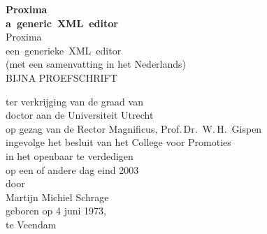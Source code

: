 \newcommand{\engtitle}{Proxima\\
a~generic~XML~editor}

\newcommand{\nltitle}{Proxima\\
een~generieke~XML~editor}

\thispagestyle{empty}

\parbox{141mm}{
\begin{center}
  {\sffamily\bfseries\Huge\engtitle\\}
  \vspace{1cm}
  {\sffamily\Large\nltitle\\}
  \vspace{1mm}
  (met een samenvatting in het Nederlands)\\
  \vspace{2cm}
  {\sffamily\Large BIJNA PROEFSCHRIFT\\}

  \vspace{0.2cm}
  
  \vspace{1cm}
  ter verkrijging van de graad van\\
  doctor aan de Universiteit Utrecht\\
  op gezag van de Rector Magnificus, Prof.\,Dr.~W.\,H.~Gispen\\
  ingevolge het besluit van het College voor Promoties\\
  in het openbaar te verdedigen\\
  op een of andere dag eind 2003\\
  \vspace{2cm}
  door\\
  \vspace{2cm}
  {\sffamily\Large Martijn Michiel Schrage\\}
  \vspace{1cm}
  geboren op 4 juni 1973,\\
  te Veendam
\end{center}
}

\clearpage
\thispagestyle{empty}

\vfill


